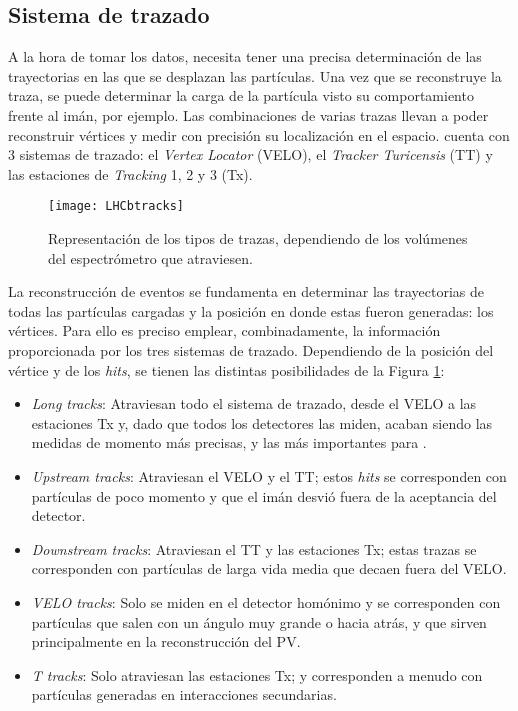 

\subsection{Sistema de trazado} %

A la hora de tomar los datos, \lhcb \cite{Alves:1129809} necesita tener una precisa determinación de las trayectorias en las que se desplazan las partículas.  Una vez que se reconstruye la traza, se puede determinar la carga de la partícula visto su comportamiento frente al imán, por ejemplo. Las combinaciones de varias trazas llevan a poder reconstruir vértices y medir con precisión su localización en el espacio. \lhcb cuenta con 3 sistemas de trazado: \color{vero} el \emph{Vertex Locator} (VELO), el \emph{Tracker Turicensis} (TT) y las estaciones de \emph{Tracking} 1, 2 y 3 (Tx). \color{norm}

\begin{figure}[H]
\texttt{[image: LHCbtracks]}
\caption{Representación de los tipos de trazas, dependiendo de los volúmenes del espectrómetro que atraviesen.}	 \label{fig_tracks}
\end{figure}

\vspace*{-1cm}

La reconstrucción de eventos se fundamenta en determinar las trayectorias de todas las partículas cargadas y la posición en donde estas fueron generadas: los vértices. Para ello es preciso emplear, combinadamente, la información proporcionada por los tres sistemas de trazado. Dependiendo de la posición del vértice y de los \emph{hits},  se tienen las distintas posibilidades \color{vero} de la Figura \ref{fig_tracks}:\color{norm}
\begin{itemize}
	\item \textit{Long tracks}: Atraviesan todo el sistema de trazado, desde el VELO a las estaciones Tx y, dado que todos los detectores las miden, acaban siendo las medidas de momento más precisas, y las más importantes para \lhcb.
	\item \textit{Upstream tracks}: Atraviesan el VELO  y el TT; estos \emph{hits} se corresponden con partículas de poco momento y que el imán desvió fuera de la aceptancia del detector.
	\item \textit{Downstream tracks}: Atraviesan el TT y las estaciones Tx; estas trazas se corresponden con partículas de larga vida media que decaen fuera del VELO.
	\item \textit{VELO tracks}: Solo se miden en el detector homónimo y se corresponden con partículas que salen con un ángulo muy grande o hacia atrás, y que sirven principalmente en la reconstrucción del PV.
	\item \textit{T tracks}: Solo atraviesan las estaciones Tx; y corresponden a menudo con partículas generadas en interacciones secundarias.
\end{itemize}
%




